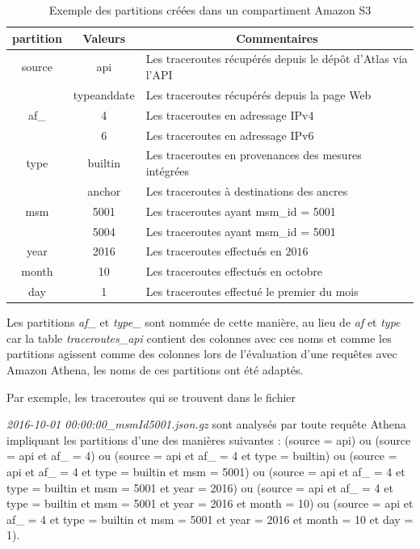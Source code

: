 \begin{table}
		\centering
		\captionsetup{justification=centering}
\begin{tabular}{|c|c|l|}
	\hline 
\textbf{partition}	& \textbf{Valeurs} & \multicolumn{1}{c|}{\textbf{Commentaires} }\\ 
	\hline 
 source& api & Les  traceroutes récupérés depuis le dépôt  d'Atlas via l'API \\ 
	\cline{2-3}
	 &typeanddate& Les  traceroutes récupérés depuis la page Web\\
	\hline 
	af\_& 4  & Les traceroutes en adressage IPv4 \\ 
	\cline{2-3} &6& Les traceroutes en adressage IPv6\\	\hline 
	type& builtin  & Les traceroutes en provenances des mesures intégrées \\ 
	\cline{2-3} 
 &anchor& Les traceroutes à destinations des ancres\\ \hline
	msm& 5001 & Les traceroutes ayant msm\_id = 5001 \\ 
	\cline{2-3}  &5004& Les traceroutes ayant msm\_id = 5001 \\
	\hline 
	year& 2016 & Les traceroutes effectués en $2016$ \\ 
	\hline 
	month& 10 & Les traceroutes effectués en octobre \\ 
	\hline 
	day& 1 & Les traceroutes effectué le premier du mois \\ 
	\hline 
\end{tabular}
\caption{Exemple des partitions créées dans un compartiment Amazon S3} 
\label{tab:partition-description}
\end{table}

 Les   partitions \textit{af\_} et \textit{type\_} sont nommée de cette manière, au lieu de \textit{af} et \textit{type} car  la table \textit{traceroutes\_api} contient des colonnes avec ces noms et comme les partitions agissent comme des colonnes  lors de l'évaluation d'une requêtes avec Amazon Athena, les noms de ces partitions ont été adaptés.

Par exemple, les traceroutes qui se trouvent dans  le fichier

 \textit{2016-10-01 00:00:00\_msmId5001.json.gz} sont analysés par toute requête Athena  
impliquant les partitions d'une des manières suivantes : 
(source = api) ou (source = api et af\_ = 4) ou (source = api et af\_ = 4 et type = builtin) ou (source = api et af\_ = 4 et type = builtin et msm = 5001) ou 
(source = api et af\_ = 4 et type = builtin et msm = 5001 et year = 2016) ou (source = api et af\_ = 4 et type = builtin et msm = 5001 et year = 2016 et month = 10) ou
 (source = api et af\_ = 4 et type = builtin et msm = 5001 et year = 2016 et month = 10 et day = 1).

